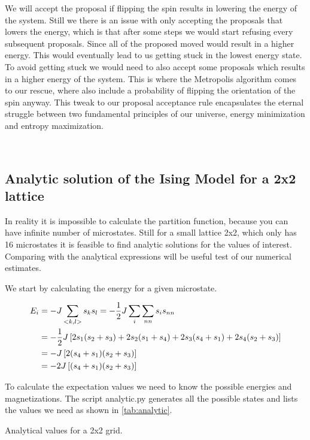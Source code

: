 We will
accept the proposal if flipping the spin results in lowering the energy of the
system. Still we there is an issue with only accepting the proposals that lowers
the energy, which is that after some steps we would start refusing every
subsequent proposals. Since all of the proposed moved would result in a higher
energy. This would eventually lead to us getting stuck in the lowest energy
state. To avoid getting stuck we would need to also accept some proposals which
results in a higher energy of the system. This is where the Metropolis
algorithm comes to our rescue, where also include a probability of flipping
the orientation of the spin anyway. This tweak to our proposal acceptance rule
encapsulates the eternal struggle between two fundamental principles of our
universe, energy minimization and entropy maximization.  


\



\subsection{Analytic solution of the Ising Model for a 2x2 lattice}
In reality it is impossible to calculate the partition function, because you can
have infinite number of microstates. Still for a small lattice 2x2, which only
has 16 microstates it is
feasible to find analytic solutions for the values of
interest. Comparing with the analytical expressions will be useful test of our
numerical estimates. 

We start by calculating the energy for a given microstate.

\begin{align*}
  E_i &= -J \sum_{<k,l>} s_k s_l = -\frac{1}{2}J \sum_{i} \sum_{nn} s_i s_{nn} \\
      &= -\frac{1}{2} J \left[2 s_1 (s_2 + s_3) + 2s_2(s_1 + s_4) + 2s_3(s_4 + s_1) + 2s_4 (s_2 + s_3)\right]\\
      &= -J\left[ 2(s_4 + s_1)(s_2 + s_3)\right] \\
      &= -2J\left[(s_4 + s_1)(s_2+s_3)\right]
\end{align*}

To calculate the expectation values we need to know the possible energies and
magnetizations. The script analytic.py \parencite{github} generates all the
possible states and lists the values we need as shown in \cref{tab:analytic}.

\begin{table}[htp]
  \centering
  \caption{Analytical values for a 2x2 grid.}
  \label{tab:analytic}
\end{table}


